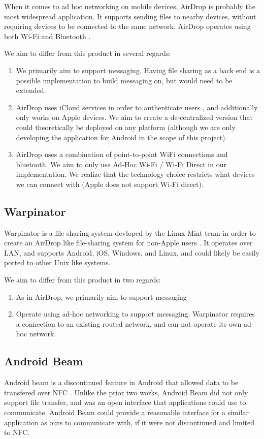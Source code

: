 \documentclass[10pt]{article}
\begin{document}
When it comes to ad hoc networking on mobile devices, AirDrop is probably the most widespread application. It supports sending files to nearby devices, without requiring devices to be connected to the same network. AirDrop operates using both Wi-Fi and Bluetooth \cite{AppleSupport}.

We aim to differ from this product in several regards:
\begin{enumerate}
    \item We primarily aim to support messaging. Having file sharing as a back end is a possible implementation to build messaging on, but would need to be extended.
    \item AirDrop uses iCloud services in order to authenticate users \cite{AppleSupportSecurity}, and additionally only works on Apple devices. We aim to create a de-centralized version that
          could theoretically be deployed on any platform (although we are only developing the application for Android in the scope of this project).
    \item AirDrop uses a combination of point-to-point WiFi connections and bluetooth. We aim to only use Ad-Hoc Wi-Fi / Wi-Fi Direct in our implementation. We realize that the technology choice restricts what devices we can connect with (Apple does not support Wi-Fi direct).
\end{enumerate}

\subsection{Warpinator}

Warpinator is a file sharing system devloped by the Linux Mint team in order to create an AirDrop like file-sharing system for non-Apple users  \cite{Webster2023linuxmint}. It operates over
LAN, and supports Android, iOS, Windows, and Linux, and could likely be easily ported to other Unix like systems.

We aim to differ from this product in two regards:
\begin{enumerate}
    \item As in AirDrop, we primarily aim to support messaging
    \item Operate using ad-hoc networking to support messaging. Warpinator requires a connection to an existing routed network, and can not operate its own ad-hoc network.
\end{enumerate}

\subsection{Android Beam}
Android beam is a discontinued \cite{Cantisano_2022} feature in Android that allowed data to be transfered over NFC \cite{AndroidDevelopers}. Unlike the prior two works, Android Beam did not only support file
transfer, and was an open interface that applications could use to communicate. Android Beam could provide a reasonable interface for a similar application as ours
to communicate with, if it were not discontinued and limited to NFC.
\end{document}

